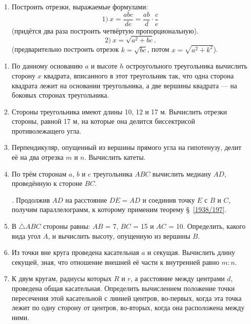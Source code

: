 \documentclass[oneside]{book}
\begin{document}
\begin{enumerate}[resume]
 \item
Построить отрезки, выражаемые формулами:
\[1)\ x=\frac{abc}{de}=\frac{ab}{d}\cdot \frac{c}{e}\]
(придётся два раза построить четвёртую пропорциональную).
\[2)\ x=\sqrt{a^2+bc}.\]
(предварительно построить отрезок $k=\sqrt{bc}$, потом $x=\sqrt{a^2+k^2}$).

\end{enumerate}

\begin{center}
\end{center}

\begin{enumerate}[resume]

 \item
По данному основанию $a$ и высоте $h$ остроугольного треугольника вычислить сторону $x$ квадрата, вписанного в этот треугольник так, что одна сторона квадрата лежит на основании треугольника, а две вершины квадрата — на боковых сторонах треугольника.

 \item
Стороны треугольника имеют длины 10, 12 и 17 м.
Вычислить отрезки стороны, равной 17 м, на которые она делится биссектрисой противолежащего угла.

 \item
Перпендикуляр, опущенный из вершины прямого угла на гипотенузу, делит её на два отрезка $m$ и $n$.
Вычислить катеты.

 \item
По трём сторонам $a$, $b$ и $c$ треугольника $ABC$ вычислить медиану $AD$, проведённую к стороне $BC$.

.
Продолжив $AD$ на расстояние $DE=AD$ и соединив точку $E$ с $B$ и $C$, получим параллелограмм, к которому применим теорему §~\ref{1938/197}.

 \item
В $\triangle ABC$ стороны равны:
$AB$ = 7, $BC$ = 15 и $AC$ = 10.
Определить, какого вида угол $A$, и вычислить высоту, опущенную из вершины $B$.

 \item
Из точки вне круга проведена касательная $a$ и секущая.
Вычислить длину секущей, зная, что отношение внешней её части к внутренней равно $m:n$.

\item
К двум кругам, радиусы которых $R$ и $r$, а расстояние между центрами $d$, проведена общая касательная.
Определить вычислением положение точки пересечения этой касательной с линией центров, во-первых, когда эта точка лежит по одну сторону от центров, во-вторых, когда она расположена между ними.

\end{enumerate}
\end{document}
